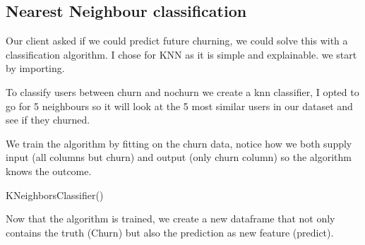 \documentclass[letterpaper,10pt,english]{jupyterBook}
\begin{document}
\subsection{Nearest Neighbour classification}
\label{\detokenize{c7_case_studies/Churn:nearest-neighbour-classification}}
\sphinxAtStartPar
Our client asked if we could predict future churning, we could solve this with a classification algorithm. I chose for KNN as it is simple and explainable. we start by importing.

\begin{sphinxVerbatim}[commandchars=\\\{\}]
   
\end{sphinxVerbatim}

\sphinxAtStartPar
To classify users between churn and nochurn we create a knn classifier, I opted to go for 5 neighbours so it will look at the 5 most similar users in our dataset and see if they churned.

\begin{sphinxVerbatim}[commandchars=\\\{\}]
  
\end{sphinxVerbatim}

\sphinxAtStartPar
We train the algorithm by fitting on the churn data, notice how we both supply input (all columns but churn) and output (only churn column) so the algorithm knows the outcome.

\begin{sphinxVerbatim}[commandchars=\\\{\}]
 
\end{sphinxVerbatim}

\begin{sphinxVerbatim}[commandchars=\\\{\}]
KNeighborsClassifier()
\end{sphinxVerbatim}

\sphinxAtStartPar
Now that the algorithm is trained, we create a new dataframe that not only contains the truth (Churn) but also the prediction as new feature (predict).
\end{document}
